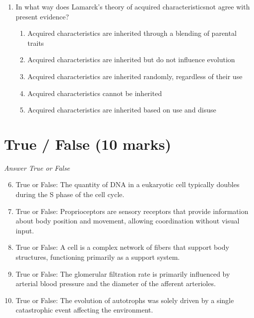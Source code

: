 \documentclass[12pt]{article}
\begin{document}
\begin{enumerate}[label=\arabic*.]
\begin{enumerate}[label=(\alph*)]
    \item Temperature, humidity, and air currents
    \item Plant species, root depth, and wind speed
    \item Soil fertility, irrigation methods, and cloud cover
    \item Water salinity, leaf color, and time of day
    \item Leaf surface area, stem length, and moon phase
\end{enumerate}
\item In what way does Lamarck's theory of acquired characteristicsnot agree with present evidence?
\begin{enumerate}[label=(\alph*)]
    \item Acquired characteristics are inherited through a blending of parental traits
    \item Acquired characteristics are inherited but do not influence evolution
    \item Acquired characteristics are inherited randomly, regardless of their use
    \item Acquired characteristics cannot be inherited
    \item Acquired characteristics are inherited based on use and disuse
\end{enumerate}
\end{enumerate}

\section*{True / False (10 marks)}
\textit{Answer True or False}
\begin{enumerate}[label=\arabic*.]
\setcounter{enumi}{5}
\item True or False: The quantity of DNA in a eukaryotic cell typically doubles during the S phase of the cell cycle.
\item True or False: Proprioceptors are sensory receptors that provide information about body position and movement, allowing coordination without visual input.
\item True or False: A cell is a complex network of fibers that support body structures, functioning primarily as a support system.
\item True or False: The glomerular filtration rate is primarily influenced by arterial blood pressure and the diameter of the afferent arterioles.
\item True or False: The evolution of autotrophs was solely driven by a single catastrophic event affecting the environment.
\end{enumerate}
\end{document}

